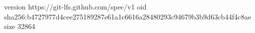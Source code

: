 version https://git-lfs.github.com/spec/v1
oid sha256:b4727977d4cee275189287e61a1c6616a28480293c94679b3b9d63cb44f4c8ae
size 32864
